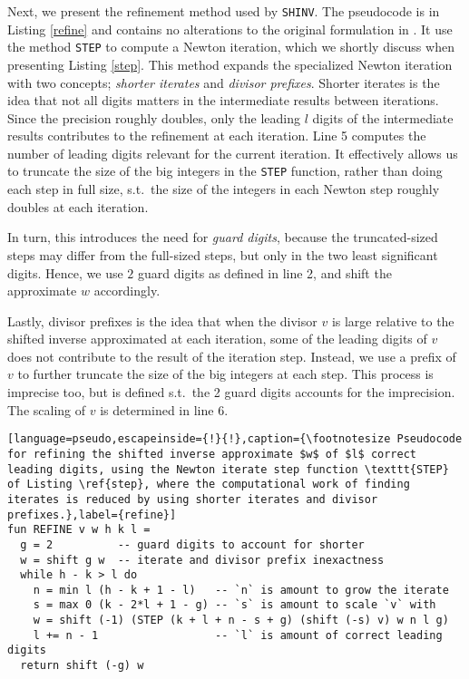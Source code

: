 Next, we present the refinement method used by \texttt{SHINV}. The pseudocode is
in Listing \ref{refine} and contains no alterations to the original formulation
in \cite{watt2023efficient}. It use the method \texttt{STEP} to compute a Newton
iteration, which we shortly discuss when presenting Listing \ref{step}. This
method expands the specialized Newton iteration with two concepts;
\textit{shorter iterates} and \textit{divisor prefixes}. Shorter iterates is the
idea that not all digits matters in the intermediate results between
iterations. Since the precision roughly doubles, only the leading $l$ digits of
the intermediate results contributes to the refinement at each iteration. Line 5
computes the number of leading digits relevant for the current iteration. It
effectively allows us to truncate the size of the big integers in the
\texttt{STEP} function, rather than doing each step in full size, s.t.\ the size
of the integers in each Newton step roughly doubles at each iteration.

In turn, this introduces the need for \textit{guard digits}, because the
truncated-sized steps may differ from the full-sized steps, but only in the two
least significant digits. Hence, we use $2$ guard digits as defined in line 2,
and shift the approximate $w$ accordingly.

Lastly, divisor prefixes is the idea that when the divisor $v$ is large relative
to the shifted inverse approximated at each iteration, some of the leading
digits of $v$ does not contribute to the result of the iteration step. Instead,
we use a prefix of $v$ to further truncate the size of the big integers at each
step. This process is imprecise too, but is defined s.t.\ the 2 guard digits
accounts for the imprecision. The scaling of $v$ is determined in line 6.

\begin{lstlisting}[language=pseudo,escapeinside={!}{!},caption={\footnotesize Pseudocode for refining the shifted inverse approximate $w$ of $l$ correct leading digits, using the Newton iterate step function \texttt{STEP} of Listing \ref{step}, where the computational work of finding iterates is reduced by using shorter iterates and divisor prefixes.},label={refine}]
fun REFINE v w h k l =
  g = 2          -- guard digits to account for shorter
  w = shift g w  -- iterate and divisor prefix inexactness
  while h - k > l do
    n = min l (h - k + 1 - l)   -- `n` is amount to grow the iterate
    s = max 0 (k - 2*l + 1 - g) -- `s` is amount to scale `v` with
    w = shift (-1) (STEP (k + l + n - s + g) (shift (-s) v) w n l g)
    l += n - 1                  -- `l` is amount of correct leading digits
  return shift (-g) w
\end{lstlisting}

